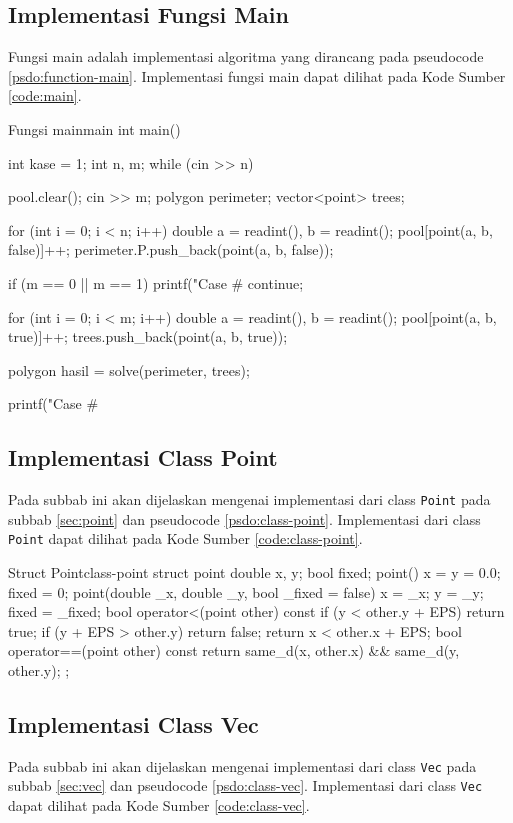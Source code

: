 \subsection{Implementasi Fungsi Main}
Fungsi main adalah implementasi algoritma yang dirancang pada pseudocode \ref{psdo:function-main}. Implementasi fungsi main dapat dilihat pada Kode Sumber \ref{code:main}. 
\begin{code}[firstnumber=1]{Fungsi main}{main}
int main(){
	int kase = 1;
	int n, m;
	while (cin >> n){
		pool.clear();
		cin >> m;
		polygon perimeter;
		vector<point> trees;

		for (int i = 0; i < n; i++){
			double a = readint(), b = readint();
			pool[point(a, b, false)]++;
			perimeter.P.push_back(point(a, b, false));
		}

		if (m == 0 || m == 1){
			printf("Case #%
			continue;
		}

		for (int i = 0; i < m; i++){
			double a = readint(), b = readint();
			pool[point(a, b, true)]++;
			trees.push_back(point(a, b, true));
		}

		polygon hasil = solve(perimeter, trees);

		printf("Case #%
	}
}
\end{code}

\subsection{Implementasi Class Point}
Pada subbab ini akan dijelaskan mengenai implementasi dari class \texttt{Point} pada subbab \ref{sec:point} dan pseudocode \ref{psdo:class-point}. Implementasi dari class \texttt{Point} dapat dilihat pada Kode Sumber \ref{code:class-point}.

\begin{code}[firstnumber=1]{Struct Point}{class-point}
struct point{
	double x, y;
	bool fixed;
	point(){
		x = y = 0.0;
		fixed = 0;
	}
	point(double _x, double _y, bool _fixed = false){
		x = _x;
		y = _y;
		fixed = _fixed;
	}
	bool operator<(point other) const{
		if (y < other.y + EPS)
			return true;
		if (y + EPS > other.y)
			return false;
		return x < other.x + EPS;
	}
	bool operator==(point other) const{
		return same_d(x, other.x) && same_d(y, other.y);
	}
};
\end{code}

\subsection{Implementasi Class Vec}
Pada subbab ini akan dijelaskan mengenai implementasi dari class \texttt{Vec} pada subbab \ref{sec:vec} dan pseudocode \ref{psdo:class-vec}. Implementasi dari class \texttt{Vec} dapat dilihat pada Kode Sumber \ref{code:class-vec}.

